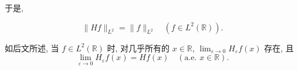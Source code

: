 于是, 

\begin{theorem}\label{thm:1.3.5}
\begin{equation*}
\| Hf \|_{L^{2}} = \| f \|_{L^{2}} \quad (f \in L^{2}(\mathbb{R})).
\end{equation*}
\end{theorem}

\begin{note}\label{note:1.3.6}
如后文所述, 当 $f \in L^{2}(\mathbb{R})$ 时, 对几乎所有的 $x \in \mathbb{R}$, $\lim_{\varepsilon \to 0}H_{\varepsilon}f(x)$ 存在, 且
\begin{equation*}
\lim_{\varepsilon \to 0}H_{\varepsilon}f(x) = Hf(x) \quad (\text{a.e. } x \in \mathbb{R}).
\end{equation*}
\end{note}
